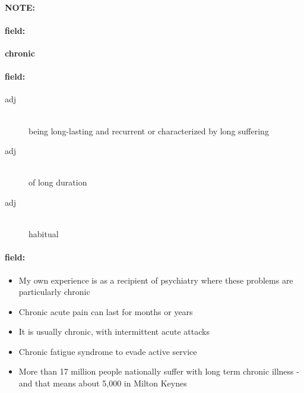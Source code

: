 \documentclass[12pt]{article}
\newenvironment{note}{\paragraph{NOTE:}}{}
\newenvironment{field}{\paragraph{field:}}{}
\begin{document}
\begin{note}
\begin{field}
\textbf{\large chronic}
\end{field}


\begin{field}
\begin{description}
\item[adj] \hfill \\ 
being long-lasting and recurrent or characterized by long suffering

\item[adj] \hfill \\ 
of long duration

\item[adj] \hfill \\ 
habitual

\end{description}
\end{field}

\begin{field}
\begin{itemize}
\item My own experience is as a recipient of psychiatry where these problems are particularly chronic
\item Chronic acute pain can last for months or years
\item It is usually chronic, with intermittent acute attacks
\item Chronic fatigue syndrome to evade active service
\item More than 17 million people nationally suffer with long term chronic illness - and that means about 5,000 in Milton Keynes
\end{itemize}
\end{field}
\end{note}
\end{document}
